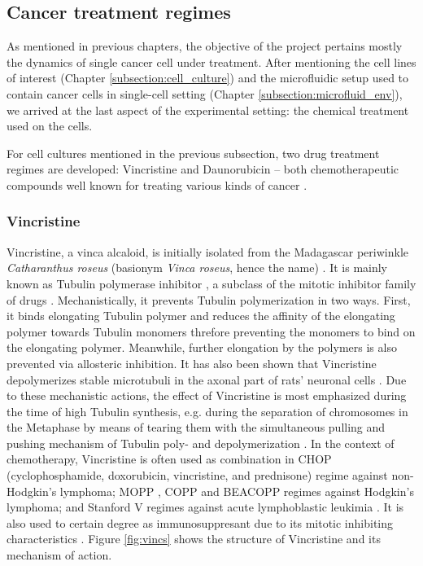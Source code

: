 \documentclass[pdftex,12pt,a4paper]{report}
\begin{document}
\subsection{Cancer treatment regimes}
\label{subsection:treatment}

As mentioned in previous chapters, the objective of the project pertains mostly the dynamics of single cancer cell under treatment. After mentioning the cell lines of interest (Chapter \ref{subsection:cell_culture}) and the microfluidic setup used to contain cancer cells in single-cell setting (Chapter \ref{subsection:microfluid_env}), we arrived at the last aspect of the experimental setting: the chemical treatment used on the cells.

For cell cultures mentioned in the previous subsection, two drug treatment regimes are developed: Vincristine and Daunorubicin -- both chemotherapeutic compounds well known for treating various kinds of cancer \cite{drugs2018defdaunorubicin, ravina2011evolution, tsuruo1981overcoming, gewirtz1999critical}.

\subsubsection*{Vincristine}

Vincristine, a vinca alcaloid, is initially isolated from the Madagascar periwinkle \textit{Catharanthus roseus} (basionym \textit{Vinca roseus}, hence the name) \cite{nci2018defvincristine}. It is mainly known as Tubulin polymerase inhibitor \cite{tsuruo1982increased}, a subclass of the mitotic inhibitor family of drugs \cite{jordan1998tubulin}. Mechanistically, it prevents Tubulin polymerization in two ways. First, it binds elongating Tubulin polymer and reduces the affinity of the elongating polymer \cite{lobert1996interaction} towards Tubulin monomers threfore preventing the monomers to bind on the elongating polymer. Meanwhile, further elongation by the polymers is also prevented via allosteric inhibition. It has also been shown that Vincristine depolymerizes stable microtubuli in the axonal part of rats' neuronal cells \cite{jordan1998tubulin}. Due to these mechanistic actions, the effect of Vincristine is most emphasized during the time of high Tubulin synthesis, e.g. during the separation of chromosomes in the Metaphase by means of tearing them with the simultaneous pulling and pushing mechanism of Tubulin poly- and depolymerization \cite{owellen1972binding}. In the context of chemotherapy, Vincristine is often used as combination in CHOP (cyclophosphamide, doxorubicin, vincristine, and prednisone) regime \cite{hiddemann2005frontline} against non-Hodgkin's lymphoma; MOPP \cite{brandriff1994chromosomal}, COPP \cite{pfreundschuh1987lomustine} and BEACOPP \cite{diehl1998beacopp} regimes against Hodgkin's lymphoma; and Stanford V regimes against acute lymphoblastic leukimia \cite{bartlett1995brief}. It is also used to certain degree as immunosuppresant due to its mitotic inhibiting characteristics \cite{ahn1974vincristine}. Figure \ref{fig:vincs} shows the structure of Vincristine and its mechanism of action.
\end{document}
